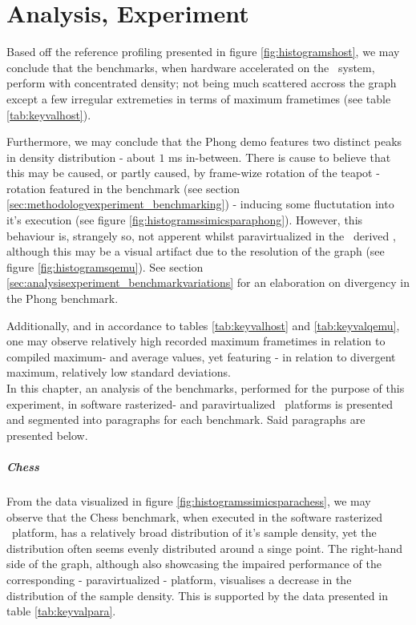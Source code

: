 
\chapter{Analysis, Experiment}
\label{cha:analysisexperiment}
Based off the reference profiling presented in figure \ref{fig:histogramshost}, we may conclude that the benchmarks, when hardware accelerated on the \dvttermhost\ system, perform with concentrated density; not being much scattered accross the graph except a few irregular extremeties in terms of maximum frametimes (see table \ref{tab:keyvalhost}).

Furthermore, we may conclude that the Phong demo features two distinct peaks in density distribution - about $1$ ms in-between.
There is cause to believe that this may be caused, or partly caused, by frame-wize rotation of the teapot - rotation featured in the benchmark (see section \ref{sec:methodologyexperiment_benchmarking}) - inducing some fluctutation into it's execution (see figure \ref{fig:histogramssimicsparaphong}).
However, this behaviour is, strangely so, not apperent whilst paravirtualized in the \dvttermqemu\ derived \dvttermandroidemulator , although this may be a visual artifact due to the resolution of the graph (see figure \ref{fig:histogramsqemu}).
See section \ref{sec:analysisexperiment_benchmarkvariations} for an elaboration on divergency in the Phong benchmark.

Additionally, and in accordance to tables \ref{tab:keyvalhost} and \ref{tab:keyvalqemu}, one may observe relatively high recorded maximum frametimes in relation to compiled maximum- and average values, yet featuring - in relation to divergent maximum, relatively low standard deviations.\\

\noindent
In this chapter, an analysis of the benchmarks, performed for the purpose of this experiment, in software rasterized- and paravirtualized \dvttermsimics\ platforms is presented and segmented into paragraphs for each benchmark.
Said paragraphs are presented below.

\paragraph{Chess}
\label{par:analysisexperiment_chess}
From the data visualized in figure \ref{fig:histogramssimicsparachess}, we may observe that the Chess benchmark, when executed in the software rasterized \dvttermsimics\ platform, has a relatively broad distribution of it's sample density, yet the distribution often seems evenly distributed around a singe point.
The right-hand side of the graph, although also showcasing the impaired performance of the corresponding - paravirtualized - platform, visualises a decrease in the distribution of the sample density.
This is supported by the data presented in table \ref{tab:keyvalpara}.

